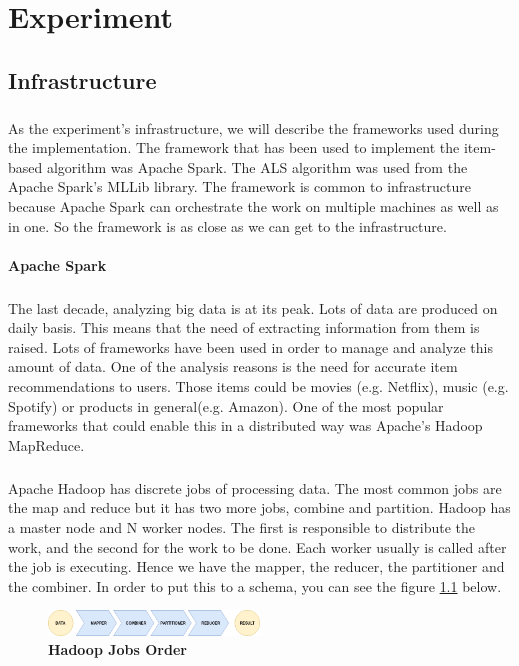 \newpage
\chapter{Experiment}
\section{Infrastructure}
\paragraph{}As the experiment's infrastructure, we will describe the frameworks used during the implementation. The framework that has been used to implement the item-based algorithm was Apache Spark. The ALS algorithm was used from the Apache Spark's MLLib library. The framework is common to infrastructure because Apache Spark can orchestrate the work on multiple machines as well as in one. So the framework is as close as we can get to the infrastructure.

\subsubsection{Apache Spark}
\paragraph{}The last decade, analyzing big data is at its peak. Lots of data are produced on daily basis. This means that the need of extracting information from them is raised. 
Lots of frameworks have been used in order to manage and analyze this amount of data. One of the analysis reasons is the need for accurate item recommendations to users. Those items could be movies (e.g. Netflix), music (e.g. Spotify) or products in general(e.g. Amazon). One of the most popular frameworks that could enable this in a distributed way was Apache's Hadoop MapReduce.


\paragraph{}Apache Hadoop has discrete jobs of processing data. The most common jobs are the map and reduce but it has two more jobs, combine and partition. Hadoop has a master node and N worker nodes. The first is responsible to distribute the work, and the second for the work to be done. Each worker usually is called after the job is executing. Hence we have the mapper, the reducer, the partitioner and the combiner. In order to put this to a schema, you can see the figure \ref{hadoopJobsOrder} below.
\\
\begin{figure}[h]
	\centering
	\includegraphics[width=0.5\textwidth]{images/HadoopMapReduceProcesses.png}
	\caption{\bfseries Hadoop Jobs Order}
	\label{hadoopJobsOrder}
\end{figure}

